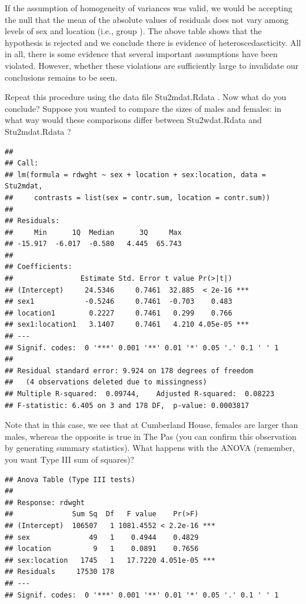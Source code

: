 \documentclass[
  12pt,
]{book}
\makeatletter
\newenvironment{kframe}{%
\medskip{}
\setlength{\fboxsep}{.8em}
\def\at@end@of@kframe{}%
\ifinner\ifhmode%
 \def\at@end@of@kframe{\end{minipage}}%
 \begin{minipage}{\columnwidth}%
\fi\fi%
\def\FrameCommand##1{\hskip\@totalleftmargin \hskip-\fboxsep
\colorbox{incolor}{##1}\hskip-\fboxsep
    \hskip-\linewidth \hskip-\@totalleftmargin \hskip\columnwidth}%
\MakeFramed {\advance\hsize-\width
  \@totalleftmargin\z@ \linewidth\hsize
  \@setminipage}}%
{\par\unskip\endMakeFramed%
\at@end@of@kframe}
\newenvironment{rmdblock}[1]
 {
 \begin{itemize}
 \renewcommand{\labelitemi}{
   \raisebox{-.7\height}[0pt][0pt]{
     {\setkeys{Gin}{width=3em,keepaspectratio}\texttt{[image: images/\#1]}}
   }
 }
 \begin{kframe}
 \setlength{\fboxsep}{1em}
 \item
 }
 {
 \end{kframe}
 \end{itemize}
 }
\newenvironment{rmdcode}
  {\begin{rmdblock}{screen}}
  {\end{rmdblock}}
\makeatother
\begin{document}
If the assumption of homogeneity of variances was valid, we would be accepting the null that the mean of the absolute values of residuals does not vary among levels of sex and location (i.e., group ). The above table shows that the hypothesis is rejected and we conclude there is evidence of heteroscedascticity. All in all, there is some evidence that several important assumptions have been violated. However, whether these violations are sufficiently large to invalidate our conclusions remains to be seen.

\begin{rmdcode}
Repeat this procedure using the data file Stu2mdat.Rdata . Now what do you conclude? Suppose you wanted to compare the sizes of males and females: in what way would these comparisons differ between Stu2wdat.Rdata and Stu2mdat.Rdata ?
\end{rmdcode}

\begin{verbatim}
## 
## Call:
## lm(formula = rdwght ~ sex + location + sex:location, data = Stu2mdat, 
##     contrasts = list(sex = contr.sum, location = contr.sum))
## 
## Residuals:
##     Min      1Q  Median      3Q     Max 
## -15.917  -6.017  -0.580   4.445  65.743 
## 
## Coefficients:
##                Estimate Std. Error t value Pr(>|t|)    
## (Intercept)     24.5346     0.7461  32.885  < 2e-16 ***
## sex1            -0.5246     0.7461  -0.703    0.483    
## location1        0.2227     0.7461   0.299    0.766    
## sex1:location1   3.1407     0.7461   4.210 4.05e-05 ***
## ---
## Signif. codes:  0 '***' 0.001 '**' 0.01 '*' 0.05 '.' 0.1 ' ' 1
## 
## Residual standard error: 9.924 on 178 degrees of freedom
##   (4 observations deleted due to missingness)
## Multiple R-squared:  0.09744,    Adjusted R-squared:  0.08223 
## F-statistic: 6.405 on 3 and 178 DF,  p-value: 0.0003817
\end{verbatim}

Note that in this case, we see that at Cumberland House, females are larger than males, whereas the opposite is true in The Pas (you can confirm this observation by generating summary statistics). What happens with the ANOVA (remember, you want Type III sum of squares)?

\begin{verbatim}
## Anova Table (Type III tests)
## 
## Response: rdwght
##              Sum Sq  Df   F value    Pr(>F)    
## (Intercept)  106507   1 1081.4552 < 2.2e-16 ***
## sex              49   1    0.4944    0.4829    
## location          9   1    0.0891    0.7656    
## sex:location   1745   1   17.7220 4.051e-05 ***
## Residuals     17530 178                        
## ---
## Signif. codes:  0 '***' 0.001 '**' 0.01 '*' 0.05 '.' 0.1 ' ' 1
\end{verbatim}
\end{document}
